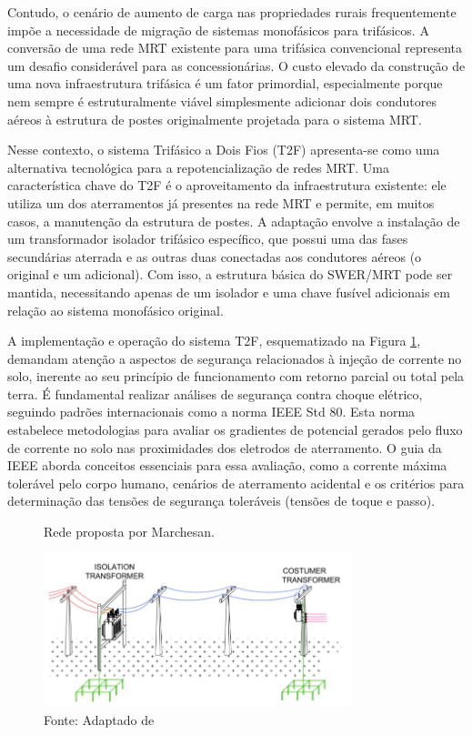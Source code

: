 \documentclass[oneside,openright,12pt]{ufsm_2021} %
\begin{document}
\par Contudo, o cenário de aumento de carga nas propriedades rurais frequentemente impõe a necessidade de migração de sistemas monofásicos para trifásicos. A conversão de uma rede MRT existente para uma trifásica convencional representa um desafio considerável para as concessionárias. O custo elevado da construção de uma nova infraestrutura trifásica é um fator primordial, especialmente porque nem sempre é estruturalmente viável simplesmente adicionar dois condutores aéreos à estrutura de postes originalmente projetada para o sistema MRT.

\par Nesse contexto, o sistema Trifásico a Dois Fios (T2F) apresenta-se como uma alternativa tecnológica para a repotencialização de redes MRT. Uma característica chave do T2F é o aproveitamento da infraestrutura existente: ele utiliza um dos aterramentos já presentes na rede MRT e permite, em muitos casos, a manutenção da estrutura de postes. A adaptação envolve a instalação de um transformador isolador trifásico específico, que possui uma das fases secundárias aterrada e as outras duas conectadas aos condutores aéreos (o original e um adicional). Com isso, a estrutura básica do SWER/MRT pode ser mantida, necessitando apenas de um isolador e uma chave fusível adicionais em relação ao sistema monofásico original.

\par A implementação e operação do sistema T2F, esquematizado na Figura \ref{fig:RedeT2FAdptadoMarchesan2023}, demandam atenção a aspectos de segurança relacionados à injeção de corrente no solo, inerente ao seu princípio de funcionamento com retorno parcial ou total pela terra. É fundamental realizar análises de segurança contra choque elétrico, seguindo padrões internacionais como a norma IEEE Std 80. Esta norma estabelece metodologias para avaliar os gradientes de potencial gerados pelo fluxo de corrente no solo nas proximidades dos eletrodos de aterramento. O guia da IEEE aborda conceitos essenciais para essa avaliação, como a corrente máxima tolerável pelo corpo humano, cenários de aterramento acidental e os critérios para determinação das tensões de segurança toleráveis (tensões de toque e passo).

\begin{figure}[H]
	\centering
	\caption{Rede proposta por Marchesan.}
	\includegraphics[width=0.8\textwidth]{figuras/Imagem3T2F2023.png}
	\caption*{Fonte: Adaptado de \cite{marchesan_three-phase-two-wire_2023}}
	\label{fig:RedeT2FAdptadoMarchesan2023}
\end{figure}
\end{document}
